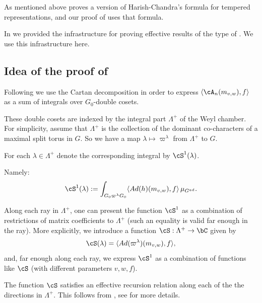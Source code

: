 \documentclass[12pt,a4paper]{amsart}%
\newcommand{\RamiA}[1]{{{#1}}}
\newcommand{\RamiF}[1]{{{#1}}}
\newcommand{\EitanD}[1]{{{#1}}}
\newcommand{\EitanC}[1]{{{#1}}}
\begin{document}
As mentioned above \cite{KYtempered} proves a version of Harish-Chandra's formula for tempered representations, and our proof of  uses that formula.

In \cite{AGKS_eff_rep} we provided \EitanD{the} infrastructure for proving effective results of the type of . We use this infrastructure here.
 
\subsection{Idea of the proof of }\label{sub:idea}
Following 
\cite{KYtempered, JL, HC_VD} 
we use the Cartan decomposition in order to express $\langle \cA_{n}(m_{v,w}),f \rangle$ as a sum of integrals over $G_0$-double cosets. 

\EitanC{These double cosets are indexed by the integral part $\Lambda^+$ of the Weyl chamber. 
\RamiA{For simplicity, assume that $\Lambda^+$ is the collection of the dominant co-characters of a maximal split torus in $G$. \RamiF{So} we have a map $\lambda \mapsto \varpi^\lambda$ from $\Lambda^+$ to $G$.}

For each $\lambda\in \Lambda^+$ denote the corresponding integral by $\cS^1(\lambda)$.} 
\RamiA{Namely:
$$\cS^1(\lambda):=\int_{G_0 \varpi^\lambda G_0} \langle Ad(h)(m_{v,w}),f\rangle \,\mu_{G^{ad}}.$$
}

\EitanC{Along each ray in $\Lambda^+$,} one can present the function $\cS^1$ as a combination of restrictions of matrix coefficients to $\Lambda^+$ \EitanC{(such an equality is valid far enough in the ray).} 
\RamiA{More explicitly,
we introduce a function $\cS:\Lambda^+\to \C$ given by $$\cS(\lambda)=\langle Ad(\varpi^\lambda)(m_{v,w}),f\rangle,$$
and, far enough along each ray, we  express $\cS^1$ as a combination of functions like $\cS$ \EitanD{(with different parameters $v,w,f$)}.
}

\EitanC{
\RamiA{The function $\cS$} satisfies an effective recursion relation along each of the the directions in $\Lambda^+$. This \RamiA{follows from} \cite[Theorem C]{AGKS_eff_rep}, see \Cref{cor:S.adm} for more details.}
\end{document}
